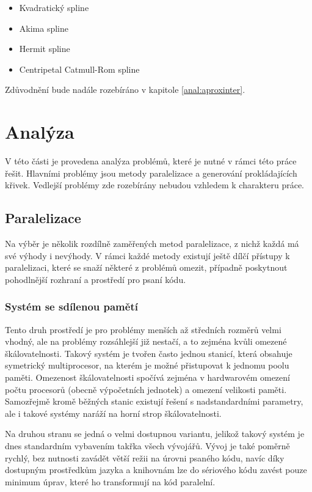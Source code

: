 \documentclass[]{thesiskiv}
\begin{document}
\begin{itemize}[noitemsep]
	\item Kvadratický spline
	\item Akima spline
	\item Hermit spline
	\item Centripetal Catmull-Rom spline
\end{itemize}
Zdůvodnění bude nadále rozebíráno v kapitole \ref{anal:aproxinter}.\\


\chapter{Analýza}

V této části je provedena analýza problémů, které je nutné v rámci této práce řešit. Hlavními problémy jsou metody paralelizace a generování prokládajících křivek. Vedlejší problémy zde rozebírány nebudou vzhledem k charakteru práce.

\section{Paralelizace}\label{anal:paralelizace}

Na výběr je několik rozdílně zaměřených metod paralelizace, z nichž každá má své výhody i nevýhody. V rámci každé metody existují ještě dílčí přístupy k paralelizaci, které se snaží některé z problémů omezit, případně poskytnout pohodlnější rozhraní a prostředí pro psaní kódu.

\subsection{Systém se sdílenou pamětí}

Tento druh prostředí je pro problémy menších až středních rozměrů velmi vhodný, ale na problémy rozsáhlejší již nestačí, a to zejména kvůli omezené škálovatelnosti. Takový systém je tvořen často jednou stanicí, která obsahuje symetrický multiprocesor, na kterém je možné přistupovat k jednomu poolu paměti. Omezenost škálovatelnosti spočívá zejména v hardwarovém omezení počtu procesorů (obecně výpočetních jednotek) a omezení velikosti paměti. Samozřejmě kromě běžných stanic existují řešení s nadstandardními parametry, ale i takové systémy naráží na horní strop škálovatelnosti.

Na druhou stranu se jedná o velmi dostupnou variantu, jelikož takový systém je dnes standardním vybavením takřka všech vývojářů. Vývoj je také poměrně rychlý, bez nutnosti zavádět větší režii na úrovni psaného kódu, navíc díky dostupným prostředkům jazyka a knihovnám lze do sériového kódu zavést pouze minimum úprav, které ho transformují na kód paralelní.
\end{document}
